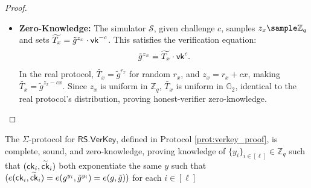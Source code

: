 \begin{proof}
\begin{itemize}
        \item \textbf{Zero-Knowledge:} The simulator $\mathcal{S}$, given challenge $c$, samples $z_x \sample \mathbb{Z}_q$ and sets $\widetilde{T_{x}} = \tilde{g}^{z_x} \cdot \mathsf{vk}^{-c}$. This satisfies the verification equation:
        \[
        \tilde{g}^{z_x} = \widetilde{T_{x}} \cdot \mathsf{vk}^c.
        \]
        In the real protocol, $\widetilde{T_{x}} = \tilde{g}^{r_x}$ for random $r_x$, and $z_x = r_x + c x$, making $\widetilde{T_{x}} = \tilde{g}^{z_x - c x}$. Since $z_x$ is uniform in $\mathbb{Z}_q$, $\widetilde{T_{x}}$ is uniform in $\mathbb{G}_2$, identical to the real protocol’s distribution, proving honest-verifier zero-knowledge.
    \end{itemize}
\end{proof}


\begin{theorem}
    The $\Sigma$-protocol for $\mathsf{RS.VerKey}$, defined in Protocol \ref{prot:verkey_proof}, is complete, sound, and zero-knowledge, proving knowledge of $\{y_i\}_{i \in [\ell]} \in \mathbb{Z}_q$ such that $(\mathsf{ck}_i, \widetilde{\mathsf{ck}}_i)$ both exponentiate the same $y$ such that $(e(\mathsf{ck}_i, \widetilde{\mathsf{ck}}_i) = e(g^{y_i}, \tilde{g}^{y_i}) = e(g, \tilde{g}))$ for each $i \in [\ell]$
\end{theorem}

